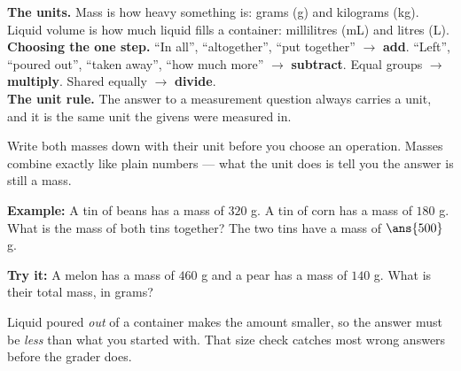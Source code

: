 \documentclass[12pt]{article}
\begin{document}

\begin{formulabox}
\textbf{The units.} Mass is how heavy something is: grams (g) and kilograms
(kg). Liquid volume is how much liquid fills a container: millilitres (mL) and
litres (L).\\[3pt]
\textbf{Choosing the one step.} ``In all'', ``altogether'', ``put together''
$\rightarrow$ \textbf{add}. ``Left'', ``poured out'', ``taken away'', ``how
much more'' $\rightarrow$ \textbf{subtract}. Equal groups $\rightarrow$
\textbf{multiply}. Shared equally $\rightarrow$ \textbf{divide}.\\[3pt]
\textbf{The unit rule.} The answer to a measurement question always carries a
unit, and it is the same unit the givens were measured in.
\end{formulabox}


\begin{formulabox}
Write both masses down with their unit before you choose an operation. Masses
combine exactly like plain numbers --- what the unit does is tell you the answer
is still a mass.
\end{formulabox}

\begin{examplebox}
\textbf{Example:} A tin of beans has a mass of $320$ g. A tin of corn has a
mass of $180$ g. What is the mass of both tins together?
The two tins have a mass of $\ans{500}$ g.
\end{examplebox}

\begin{tryitbox}
\textbf{Try it:} A melon has a mass of $460$ g and a pear has a mass of $140$ g.
What is their total mass, in grams?\\[2pt]
\end{tryitbox}


\begin{formulabox}
Liquid poured \emph{out} of a container makes the amount smaller, so the answer
must be \emph{less} than what you started with. That size check catches most
wrong answers before the grader does.
\end{formulabox}
\end{document}
